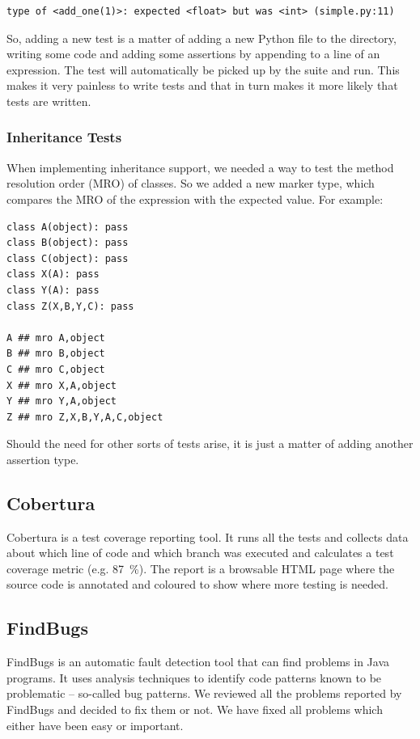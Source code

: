 \documentclass[12pt,halfparskip,DIV11,BCOR10mm]{scrreprt}
\begin{document}
\begin{verbatim}
type of <add_one(1)>: expected <float> but was <int> (simple.py:11)
\end{verbatim}

So, adding a new test is a matter of adding a new Python file to the directory, writing some code and adding some assertions by appending  to a line of an expression. The test will automatically be picked up by the suite and run. This makes it very painless to write tests and that in turn makes it more likely that tests are written.

\subsubsection{Inheritance Tests}

When implementing inheritance support, we needed a way to test the method resolution order (MRO) of classes. So we added a new marker type,  which compares the MRO of the expression with the expected value. For example:

\begin{lstlisting}
class A(object): pass
class B(object): pass
class C(object): pass
class X(A): pass
class Y(A): pass
class Z(X,B,Y,C): pass

A ## mro A,object
B ## mro B,object
C ## mro C,object
X ## mro X,A,object
Y ## mro Y,A,object
Z ## mro Z,X,B,Y,A,C,object
\end{lstlisting}

Should the need for other sorts of tests arise, it is just a matter of adding another assertion type.

\subsection{Cobertura}

Cobertura is a test coverage reporting tool. It runs all the tests and collects data about which line of code and which branch was executed and calculates a test coverage metric (e.g. 87~\%). The report is a browsable HTML page where the source code is annotated and coloured to show where more testing is needed.

\subsection{FindBugs}

FindBugs is an automatic fault detection tool that can find problems in Java programs. It uses analysis techniques to identify code patterns known to be problematic – so-called bug patterns. We reviewed all the problems reported by FindBugs and decided to fix them or not. We have fixed all problems which either have been easy or important.
\end{document}
